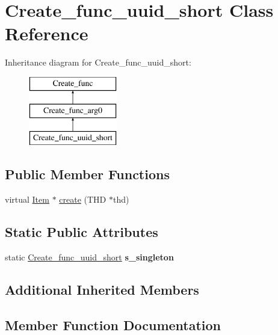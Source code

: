 \hypertarget{classCreate__func__uuid__short}{}\section{Create\+\_\+func\+\_\+uuid\+\_\+short Class Reference}
\label{classCreate__func__uuid__short}
Inheritance diagram for Create\+\_\+func\+\_\+uuid\+\_\+short\+:\begin{figure}[H]
\begin{center}
\leavevmode
\includegraphics[height=3.000000cm]{classCreate__func__uuid__short}
\end{center}
\end{figure}
\subsection*{Public Member Functions}
\begin{DoxyCompactItemize}
\item 
virtual \mbox{\hyperlink{classItem}{Item}} $\ast$ \mbox{\hyperlink{classCreate__func__uuid__short_ae69583dfc7846d042e22edba10675898}{create}} (T\+HD $\ast$thd)
\end{DoxyCompactItemize}
\subsection*{Static Public Attributes}
\begin{DoxyCompactItemize}
\item 
\mbox{\label{classCreate__func__uuid__short_ab2013cd9acdd5d7ae44b20f46658d23d}} 
static \mbox{\hyperlink{classCreate__func__uuid__short}{Create\+\_\+func\+\_\+uuid\+\_\+short}} {\bfseries s\+\_\+singleton}
\end{DoxyCompactItemize}
\subsection*{Additional Inherited Members}


\subsection{Member Function Documentation}
\mbox{\label{classCreate__func__uuid__short_ae69583dfc7846d042e22edba10675898}} 
